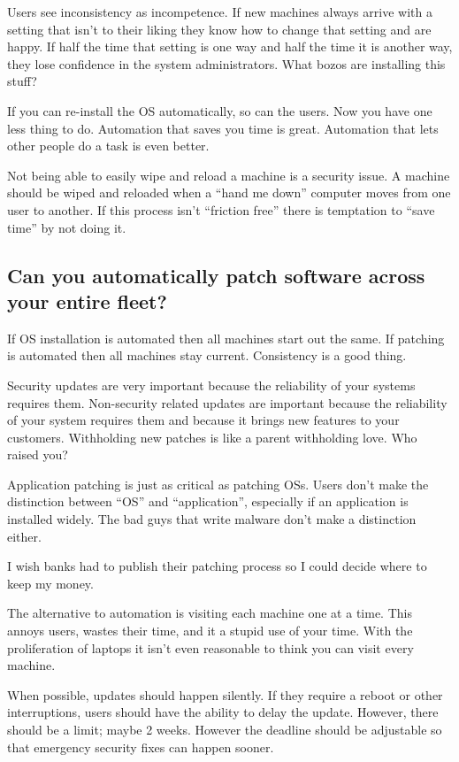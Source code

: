 \documentclass{article}
\begin{document}
Users see inconsistency as incompetence. If new machines always arrive with a setting that isn't to their liking they know how to change that setting and are happy. If half the time that setting is one way and half the time it is another way, they lose confidence in the system administrators. What bozos are installing this stuff?

If you can re-install the OS automatically, so can the users. Now you have one less thing to do. Automation that saves you time is great. Automation that lets other people do a task is even better.

Not being able to easily wipe and reload a machine is a security issue. A machine should be wiped and reloaded when a ``hand me down'' computer moves from one user to another. If this process isn't ``friction free'' there is temptation to ``save time'' by not doing it.

\subsection{Can you automatically patch software across your entire fleet? \Checkmark}
If OS installation is automated then all machines start out the same. If patching is automated then all machines stay current. Consistency is a good thing.

Security updates are very important because the reliability of your systems requires them. Non-security related updates are important because the reliability of your system requires them and because it brings new features to your customers. Withholding new patches is like a parent withholding love. Who raised you?

Application patching is just as critical as patching OSs. Users don't make the distinction between ``OS'' and ``application'', especially if an application is installed widely. The bad guys that write malware don't make a distinction either.

I wish banks had to publish their patching process so I could decide where to keep my money.

The alternative to automation is visiting each machine one at a time. This annoys users, wastes their time, and it a stupid use of your time. With the proliferation of laptops it isn't even reasonable to think you can visit every machine.

When possible, updates should happen silently. If they require a reboot or other interruptions, users should have the ability to delay the update. However, there should be a limit; maybe 2 weeks. However the deadline should be adjustable so that emergency security fixes can happen sooner.
\end{document}
